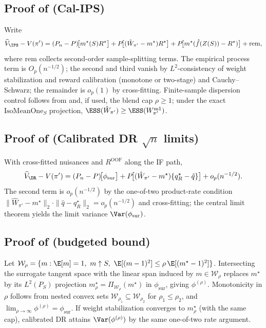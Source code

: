 \subsection{Proof of \texorpdfstring{}{Proposition 1} (Cal-IPS)}
\label{app:proof-calips}
Write
\[
\widehat V_{\IPS}-V(\pi')=(P_n-P)\!\big[m^\star(S)R^\star\big] + P\!\big[(\hat W_{\pi'}-m^\star)R^\star\big]+ P\!\big[m^\star(\hat f(Z(S))-R^\star)\big] + \mathrm{rem},
\]
where $\mathrm{rem}$ collects second-order sample-splitting terms. The empirical process term is $O_p(n^{-1/2})$; the second and third vanish by $L^2$-consistency of weight stabilization and reward calibration (monotone or two-stage) and Cauchy--Schwarz; the remainder is $o_p(1)$ by cross-fitting. Finite-sample dispersion control follows from  and, if used, the blend cap $\rho\ge1$; under the exact $\mathrm{IsoMeanOne}_S$ projection, $\ESS(\hat W_{\pi'})\ge \ESS(W_{\pi'}^{\mathrm{m1}})$.

\subsection{Proof of \texorpdfstring{}{Theorem 3} (Calibrated DR $\sqrt{n}$ limits)}
\label{app:proof-dr}
With cross-fitted nuisances and $R^{\mathrm{OOF}}$ along the IF path,
\[
\widehat V_{\DR}-V(\pi')
= (P_n-P)\!\big[\phi_{\mathrm{sur}}\big]
 + P\!\big[(\hat W_{\pi'}-m^\star)\{q^\star_R-\hat q\}\big]
 + o_p(n^{-1/2}).
\]
The second term is $o_p(n^{-1/2})$ by the one-of-two product-rate condition $\|\hat W_{\pi'}-m^\star\|_2\cdot \|\hat q-q^\star_R\|_2=o_p(n^{-1/2})$ and cross-fitting; the central limit theorem yields the limit variance $\Var(\phi_{\mathrm{sur}})$.

\subsection{Proof of \texorpdfstring{}{Theorem 4} (budgeted bound)}
\label{app:proof-budget}
Let $\mathcal{W}_\rho=\{m:\E[m]=1,\ m\uparrow S,\ \E[(m-1)^2]\le \rho\,\E[(m^\star-1)^2]\}$. Intersecting the surrogate tangent space with the linear span induced by $m\in\mathcal{W}_\rho$ replaces $m^\star$ by its $L^2(P_S)$ projection $m^\star_\rho=\Pi_{\mathcal{W}_\rho}(m^\star)$ in $\phi_{\mathrm{sur}}$, giving $\phi^{(\rho)}$. Monotonicity in $\rho$ follows from nested convex sets $\mathcal{W}_{\rho_1}\subseteq \mathcal{W}_{\rho_2}$ for $\rho_1\le\rho_2$, and $\lim_{\rho\to\infty}\phi^{(\rho)}=\phi_{\mathrm{sur}}$. If weight stabilization converges to $m^\star_\rho$ (with the same cap), calibrated DR attains $\Var(\phi^{(\rho)})$ by the same one-of-two rate argument.

